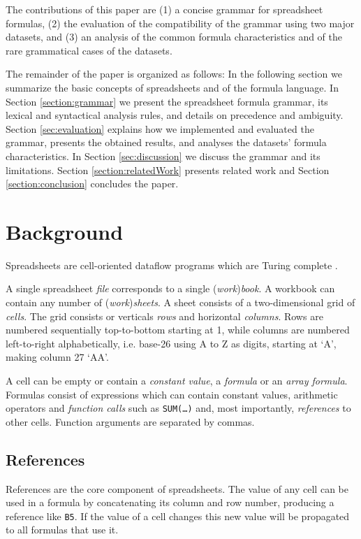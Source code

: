 \documentclass[conference]{IEEEtran}
\begin{document}
The contributions of this paper are (1) a concise grammar for spreadsheet formulas, (2) the evaluation of the compatibility of the grammar using two major datasets, and (3) an analysis of the common formula characteristics and of the rare grammatical cases of the datasets.

The remainder of the paper is organized as follows: In the following section we summarize the basic concepts of spreadsheets and of the formula language. In Section \ref{section:grammar} we present the spreadsheet formula grammar, its lexical and syntactical analysis rules, and details on precedence and ambiguity. Section \ref{sec:evaluation} explains how we implemented and evaluated the grammar, presents the obtained results, and analyses the datasets' formula characteristics. In Section \ref{sec:discussion} we discuss the grammar and its limitations. Section \ref{section:relatedWork} presents related work and Section \ref{section:conclusion} concludes the paper.

\section{Background}

Spreadsheets are cell-oriented dataflow programs which are Turing complete \cite{ExcelTuringComplete}.

A single spreadsheet \emph{file} corresponds to a single (\emph{work})\emph{book}.
A workbook can contain any number of (\emph{work})\emph{sheets}.
A sheet consists of a two-dimensional grid of \emph{cells}.
The grid consists or verticals \emph{rows} and horizontal \emph{columns}.
Rows are numbered sequentially top-to-bottom starting at 1, while columns are numbered left-to-right alphabetically, i.e. base-26 using A to Z as digits, starting at `A', making column 27 `AA'.

A cell can be empty or contain a \emph{constant value}, a \emph{formula} or an \emph{array formula}.
Formulas consist of expressions which can contain constant values, arithmetic operators and \emph{function calls} such as \texttt{SUM(\ldots)} and, most importantly, \emph{references} to other cells.
Function arguments are separated by commas.

\subsection{References}
References are the core component of spreadsheets.
The value of any cell can be used in a formula by concatenating its column and row number, producing a reference like \texttt{B5}.
If the value of a cell changes this new value will be propagated to all formulas that use it.
\end{document}
